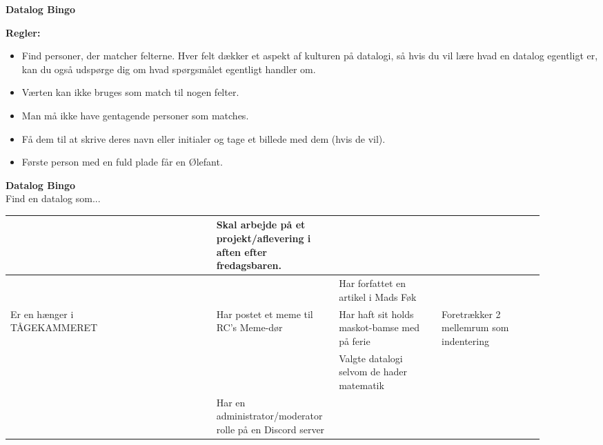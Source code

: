 \documentclass{article}
\begin{document}
\begin{center}
{\LARGE\bfseries Datalog Bingo}\\[2em]
\end{center}

{\large
\textbf{Regler:}
\begin{itemize}
\item Find personer, der matcher felterne. Hver felt dækker et aspekt af kulturen på datalogi, så hvis du vil lære hvad en datalog egentligt er, kan du også udspørge dig om hvad spørgsmålet egentligt handler om.
\item Værten kan ikke bruges som match til nogen felter.
\item Man må ikke have gentagende personer som matches.
\item Få dem til at skrive deres navn eller initialer og tage et billede med dem (hvis de vil).
\item Første person med en fuld plade får en Ølefant.
\end{itemize}
}
\newpage

\begin{center}
{\LARGE\bfseries Datalog Bingo}\\[0.5em]
{\large Find en datalog som...}\\[2em]
\begin{tabular}{|p{0.18\linewidth}|p{0.18\linewidth}|p{0.18\linewidth}|p{0.18\linewidth}|p{0.18\linewidth}|}
\hline
  &   & Skal arbejde på et projekt/aflevering i aften efter fredagsbaren. &   &   \\
\hline
  &   &   & Har forfattet en artikel i Mads Føk &   \\
\hline
Er en hænger i TÅGEKAMMERET &   & Har postet et meme til RC's Meme-dør & Har haft sit holds maskot-bamse med på ferie & Foretrækker 2 mellemrum som indentering \\
\hline
  &   &   & Valgte datalogi selvom de hader matematik &   \\
\hline
  &   & Har en administrator/moderator rolle på en Discord server &   &   \\
\hline
\end{tabular}
\end{center}
\newpage
\end{document}

